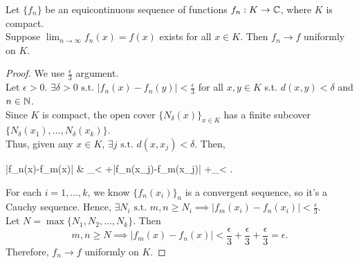 \begin{problem}[7.16]
Let $\{f_n\}$ be an equicontinuous sequence of functions $f_n:K\to \mathbb{C}$, where $K$ is compact.\\
Suppose $\lim_{n\to \infty}{f_n(x)}=f(x)$ exists for all $x \in K$. Then $f_n\to f$ uniformly on $K$.
\begin{proof}
	We use $\frac{\epsilon}{3}$ argument.\\
	Let $\epsilon>0$. $\exists{\delta > 0} \text{ s.t. } \left|f_n(x)-f_n(y)\right| <\frac{\epsilon}{3}$ for all $x,y \in K$ s.t. $d(x,y)<\delta$ and $n \in \mathbb{N}$.\\
	Since $K$ is compact, the open cover $\{N_{\delta}(x)\}_{x \in K}$ has a finite subcover $\{N_{\delta}(x_1),\ldots,N_{\delta}(x_k)\}$.\\
	Thus, given any $x \in K$, $\exists j \text{ s.t. } d(x,x_j)<\delta$. Then,
	\begin{flalign*}
		\left|f_n(x)-f_m(x)\right| & \le {}_{<} +\left|f_n(x_j)-f_m(x_j)\right| +_{<}
		.\end{flalign*}
	For each $i=1,\ldots ,k$, we know $\{f_n(x_i)\}_n$ is a convergent sequence, so it's a Cauchy sequence. Hence, $\exists{N_i} \text{ s.t. } m,n\ge N_i\implies \left|f_m(x_i)-f_n(x_i)\right|<\frac{\epsilon}{3}$.\\
	Let $N=\max\{N_1,N_2,\ldots ,N_k\} $. Then \[
		m,n\ge N\implies \left|f_m(x)-f_n(x)\right| <\frac{\epsilon}{3}+\frac{\epsilon}{3}+\frac{\epsilon}{3} =\epsilon
		.\]
	Therefore, $f_{n}\to f$ uniformly on $K$.
\end{proof}
\end{problem}
